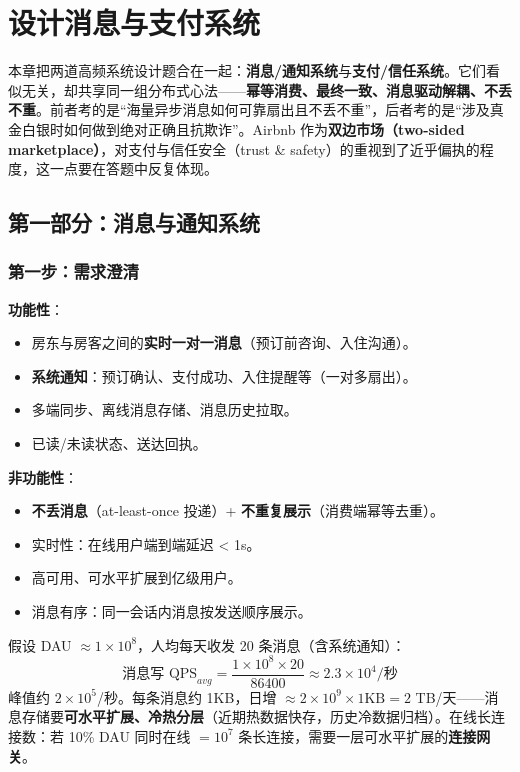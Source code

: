 \chapter{设计消息与支付系统}

本章把两道高频系统设计题合在一起：\textbf{消息/通知系统}与\textbf{支付/信任系统}。它们看似无关，却共享同一组分布式心法——\textbf{幂等消费、最终一致、消息驱动解耦、不丢不重}。前者考的是“海量异步消息如何可靠扇出且不丢不重”，后者考的是“涉及真金白银时如何做到绝对正确且抗欺诈”。Airbnb 作为\textbf{双边市场（two-sided marketplace）}，对支付与信任安全（trust \& safety）的重视到了近乎偏执的程度，这一点要在答题中反复体现。

\section{第一部分：消息与通知系统}

\subsection{第一步：需求澄清}

\textbf{功能性}：

\begin{itemize}
  \item 房东与房客之间的\textbf{实时一对一消息}（预订前咨询、入住沟通）。
  \item \textbf{系统通知}：预订确认、支付成功、入住提醒等（一对多扇出）。
  \item 多端同步、离线消息存储、消息历史拉取。
  \item 已读/未读状态、送达回执。
\end{itemize}

\textbf{非功能性}：

\begin{itemize}
  \item \textbf{不丢消息}（at-least-once 投递）+ \textbf{不重复展示}（消费端幂等去重）。
  \item 实时性：在线用户端到端延迟 < 1s。
  \item 高可用、可水平扩展到亿级用户。
  \item 消息有序：同一会话内消息按发送顺序展示。
\end{itemize}

\begin{keypoint}
假设 DAU $\approx 1\times10^8$，人均每天收发 20 条消息（含系统通知）：
\[
  \text{消息写 QPS}_{avg} = \frac{1\times10^8 \times 20}{86400} \approx 2.3\times10^4 \text{/秒}
\]
峰值约 $2\times10^5$/秒。每条消息约 1KB，日增 $\approx 2\times10^9 \times 1\text{KB} = 2$ TB/天——消息存储要\textbf{可水平扩展、冷热分层}（近期热数据快存，历史冷数据归档）。在线长连接数：若 10\% DAU 同时在线 $= 10^7$ 条长连接，需要一层可水平扩展的\textbf{连接网关}。
\end{keypoint}

